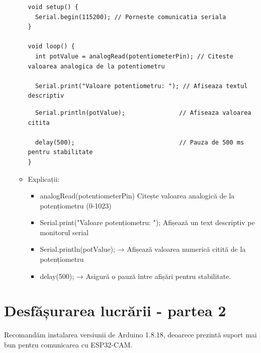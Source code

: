 \documentclass{report}
\begin{document}
\begin{itemize}
\begin{itemize}
\begin{lstlisting}
void setup() {
  Serial.begin(115200); // Porneste comunicatia seriala
}

void loop() {
  int potValue = analogRead(potentiometerPin); // Citeste valoarea analogica de la potentiometru

  Serial.print("Valoare potentiometru: "); // Afiseaza textul descriptiv
  \end{lstlisting}
  \newpage
  \vspace*{1cm}
  \begin{lstlisting}
  Serial.println(potValue);               // Afiseaza valoarea citita

  delay(500);                             // Pauza de 500 ms pentru stabilitate
}

                    \end{lstlisting}
                    \item Explicații: 
                        \begin{itemize}
                            \item analogRead(potentiometerPin)   Citește valoarea analogică de la potențiometru (0-1023)
                            \item Serial.print("Valoare potențiometru: ");   Afișează un text descriptiv pe monitorul serial
                            \item Serial.println(potValue); → Afișează valoarea numerică citită de la potențiometru
                            \item delay(500); → Asigură o pauză între afișări pentru stabilitate.
                            
                        \end{itemize}
            \end{itemize}
            
\end{itemize}

\chapter{Desfășurarea lucrării - partea 2}
Recomandăm instalarea versiunii de Arduino 1.8.18, deoarece prezintă suport mai bun pentru comunicarea cu ESP32-CAM.
\end{document}
